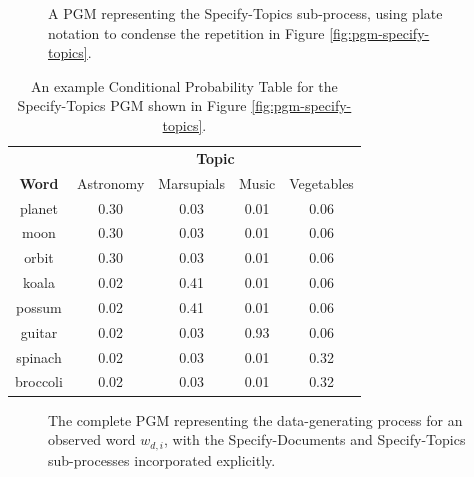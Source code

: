 \documentclass[11pt]{article}
\begin{document}

\begin{figure}[ht!]
	\centering
	\caption{A PGM representing the \textsf{Specify-Topics} sub-process, using plate notation to condense the repetition in Figure \ref{fig:pgm-specify-topics}.}
	\label{fig:pgm-specify-topics-plate}
\end{figure}

\begin{table}[ht!]
	\centering
	\begin{tabular}{ccccc}
		\toprule
		& \multicolumn{4}{c}{\textbf{Topic}} \\
		\textbf{Word} & Astronomy & Marsupials & Music & Vegetables \\
		\midrule
		planet & 0.30 & 0.03 & 0.01 & 0.06 \\
		moon & 0.30 & 0.03 & 0.01 & 0.06 \\
		orbit & 0.30 & 0.03 & 0.01 & 0.06 \\
		koala & 0.02 & 0.41 & 0.01 & 0.06 \\
		possum & 0.02 & 0.41 & 0.01 & 0.06 \\
		guitar & 0.02 & 0.03 & 0.93 & 0.06 \\
		spinach & 0.02 & 0.03 & 0.01 & 0.32 \\
		broccoli & 0.02 & 0.03 & 0.01 & 0.32 \\
	\end{tabular}
	\caption{An example Conditional Probability Table for the \textsf{Specify-Topics} PGM shown in Figure \ref{fig:pgm-specify-topics}.}
	\label{tab:cpt-specify-topics}
\end{table}


\begin{figure}[ht!]
	\centering
	\caption{The complete PGM representing the data-generating process for an observed word $w_{d,i}$, with the \textsf{Specify-Documents} and \textsf{Specify-Topics} sub-processes incorporated explicitly.}
	\label{fig:pgm-full}
\end{figure}
\end{document}

